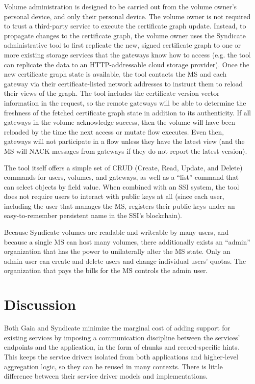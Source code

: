 Volume administration is designed to be carried out from the volume owner's
personal device, and only their personal device.  The volume owner is not
required to trust a third-party service to execute the certificate graph update.
Instead, to propagate changes
to the certificate graph, the volume owner uses the Syndicate
administrative tool to first replicate the new, signed certificate graph to one or more
existing storage services that the gateways know how to access (e.g. the tool
can replicate the data to an HTTP-addressable cloud storage provider).  Once the
new certificate graph state is available, the tool contacts the MS and
each gateway via their certificate-listed network
addresses to instruct them to reload their views of the graph.  The tool includes the
certificate version vector information in the request, so the remote gateways will be able to
determine the freshness of the fetched certificate graph state in addition to
its authenticity.  If all gateways in the volume acknowledge success, then the
volume will have been reloaded by the time the next access or mutate flow
executes.  Even then, gateways will not participate in a flow unless they have
the latest view (and the MS will NACK messages from gateways if they do not
report the latest version).

The tool itself offers a simple set of CRUD (Create, Read, Update,
and Delete) commands for users, volumes, and
gateways, as well as a ``list'' command that can select objects by field value.
When combined with an SSI system, the tool does not require users to interact with
public keys at all (since each user, including the user that manages the MS,
registers their public keys under an easy-to-remember persistent name in the
SSI's blockchain).

Because Syndicate volumes are readable and writeable by many users, and because
a single MS can host many volumes, there additionally exists an ``admin''
organization that has the power to unilaterally alter the MS state.  Only an
admin user can create and delete users and change individual users' quotas.
The organization that pays the bills for the MS controls the admin user.

\section{Discussion}

Both Gaia and Syndicate minimize the marginal cost of adding support for
existing services by imposing a communication discipline between the services'
endpoints and the application, in the form of chunks and record-specific hints.
This keeps the service drivers isolated from both applications and higher-level
aggregation logic, so they can be reused in many contexts.  There is little
difference between their service driver models and implementations.

